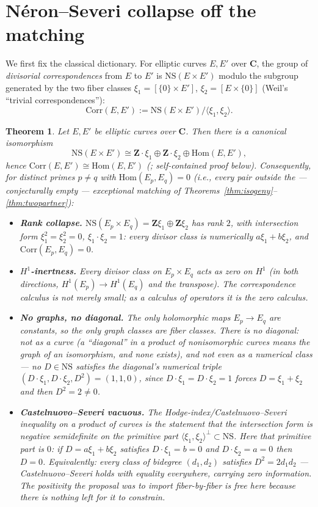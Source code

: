 \documentclass[11pt]{article}
\newtheorem{theorem}{Theorem}
\theoremstyle{definition}
\theoremstyle{remark}
\newcommand{\Z}{\mathbf{Z}}
\newcommand{\C}{\mathbf{C}}
\newcommand{\NS}{\mathrm{NS}}
\newcommand{\Hom}{\mathrm{Hom}}
\newcommand{\Corr}{\mathrm{Corr}}
\begin{document}
\section{N\'eron--Severi collapse off the matching}
\label{sec:NS}

We first fix the classical dictionary. For elliptic curves $E, E'$ over
$\C$, the group of \emph{divisorial correspondences} from $E$ to $E'$ is
$\NS(E \times E')$ modulo the subgroup generated by the two fiber classes
$\xi_1 = [\{0\}\times E']$, $\xi_2 = [E\times\{0\}]$ (Weil's ``trivial
correspondences''):
\[
\Corr(E, E') := \NS(E \times E') / \langle \xi_1, \xi_2 \rangle .
\]

\begin{theorem}
\label{thm:NS}
Let $E, E'$ be elliptic curves over $\C$. Then there is a canonical
isomorphism
\[
\NS(E \times E') \cong \Z\cdot\xi_1 \oplus \Z\cdot\xi_2 \oplus \Hom(E, E') ,
\]
hence $\Corr(E, E') \cong \Hom(E, E')$ (\cite[Ch.~5]{BL}; self-contained
proof below). Consequently, for distinct primes $p \neq q$ with
$\Hom(E_p, E_q) = 0$ (i.e., every pair outside the --- conjecturally
empty --- exceptional matching of
Theorems~\ref{thm:isogeny}--\ref{thm:twopartner}):
\begin{itemize}
\item[\textup{(a)}] \textbf{Rank collapse.}
$\NS(E_p \times E_q) = \Z\xi_1 \oplus \Z\xi_2$ has rank $2$, with
intersection form $\xi_1^2 = \xi_2^2 = 0$, $\xi_1\cdot\xi_2 = 1$: every
divisor class is numerically $a\xi_1 + b\xi_2$, and $\Corr(E_p, E_q) = 0$.
\item[\textup{(b)}] \textbf{$H^1$-inertness.} Every divisor class on
$E_p \times E_q$ acts as zero on $H^1$ (in both directions,
$H^1(E_p) \to H^1(E_q)$ and the transpose). The correspondence calculus is
not merely small; as a calculus of operators it is the zero calculus.
\item[\textup{(c)}] \textbf{No graphs, no diagonal.} The only holomorphic
maps $E_p \to E_q$ are constants, so the only graph classes are fiber
classes. There is no diagonal: not as a curve (a ``diagonal'' in a product
of nonisomorphic curves means the graph of an isomorphism, and none exists),
and not even as a numerical class --- no $D \in \NS$ satisfies the
diagonal's numerical triple $(D\cdot\xi_1, D\cdot\xi_2, D^2) = (1, 1, 0)$,
since $D\cdot\xi_1 = D\cdot\xi_2 = 1$ forces $D = \xi_1 + \xi_2$ and then
$D^2 = 2 \neq 0$.
\item[\textup{(d)}] \textbf{Castelnuovo--Severi vacuous.} The
Hodge-index/Castelnuovo--Severi inequality on a product of curves is the
statement that the intersection form is negative semidefinite on the
\emph{primitive} part $\langle \xi_1, \xi_2 \rangle^\perp \subset \NS$. Here
that primitive part is $0$: if $D = a\xi_1 + b\xi_2$ satisfies
$D\cdot\xi_1 = b = 0$ and $D\cdot\xi_2 = a = 0$ then $D = 0$. Equivalently:
every class of bidegree $(d_1, d_2)$ satisfies $D^2 = 2 d_1 d_2$ ---
Castelnuovo--Severi holds \emph{with equality everywhere}, carrying zero
information. The positivity the proposal was to import fiber-by-fiber is free
here because there is nothing left for it to constrain.
\end{itemize}
\end{theorem}
\end{document}
